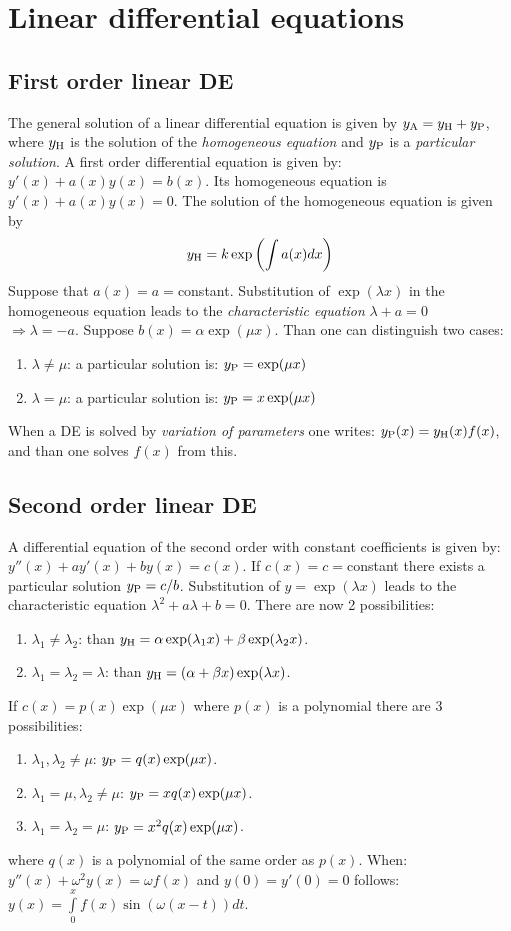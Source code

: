 \documentclass[twoside]{report}
\begin{document}
\section{Linear differential equations}
\subsection{First order linear DE}
The general solution of a linear differential equation is given by
$y_{\rm A}=y_{\rm H}+y_{\rm P}$, where $y_{\rm H}$ is the solution of the
{\it homogeneous equation} and $y_{\rm P}$ is a {\it particular solution}.
\npar
A first order differential equation is given by: $y'(x)+a(x)y(x)=b(x)$.
Its homogeneous equation is $y'(x)+a(x)y(x)=0$.
\npar
The solution of the homogeneous equation is given by
\[
y_{\rm H}=k\exp\left(\int a(x)dx\right)
\]
Suppose that $a(x)=a=$constant.
\npar
Substitution of $\exp(\lambda x)$ in the homogeneous equation leads to the
{\it characteristic equation} $\lambda+a=0$\\ $\Rightarrow\lambda=-a$.
\npar
Suppose $b(x)=\alpha\exp(\mu x)$. Than one can distinguish two cases:
\begin{enumerate}
\item $\lambda\neq\mu$: a particular solution is: $y_{\rm P}=\exp(\mu x)$
\item $\lambda=\mu$: a particular solution is: $y_{\rm P}=x\exp(\mu x)$
\end{enumerate}
\npar
When a DE is solved by {\it variation of parameters} one writes:
$y_{\rm P}(x)=y_{\rm H}(x)f(x)$, and than one solves $f(x)$ from this.

\subsection{Second order linear DE}
A differential equation of the second order with constant coefficients is given
by: $y''(x)+ay'(x)+by(x)=c(x)$. If $c(x)=c=$constant there exists a particular
solution $y_{\rm P}=c/b$.
\npar
Substitution of $y=\exp(\lambda x)$ leads to the characteristic equation
$\lambda^2+a\lambda+b=0$.
\npar
There are now 2 possibilities:
\begin{enumerate}
\item $\lambda_1\neq\lambda_2$: than $y_{\rm H}=\alpha\exp(\lambda_1 x)+\beta\exp(\lambda_2 x)$.
\item $\lambda_1=\lambda_2=\lambda$: than $y_{\rm H}=(\alpha +\beta x)\exp(\lambda x)$.
\end{enumerate}
\npar
If $c(x)=p(x)\exp(\mu x)$ where $p(x)$ is a polynomial there are 3 possibilities:
\begin{enumerate}
\item $\lambda_1,\lambda_2\neq\mu$: $y_{\rm P}=q(x)\exp(\mu x)$.
\item $\lambda_1=\mu,\lambda_2\neq\mu$: $y_{\rm P}=xq(x)\exp(\mu x)$.
\item $\lambda_1=\lambda_2=\mu$: $y_{\rm P}=x^2q(x)\exp(\mu x)$.
\end{enumerate}
where $q(x)$ is a polynomial of the same order as $p(x)$.
\npar
When: $y''(x)+\omega^2y(x)=\omega f(x)$ and $y(0)=y'(0)=0$ follows:
$y(x)=\int\limits_0^xf(x)\sin(\omega(x-t))dt$.
\end{document}

